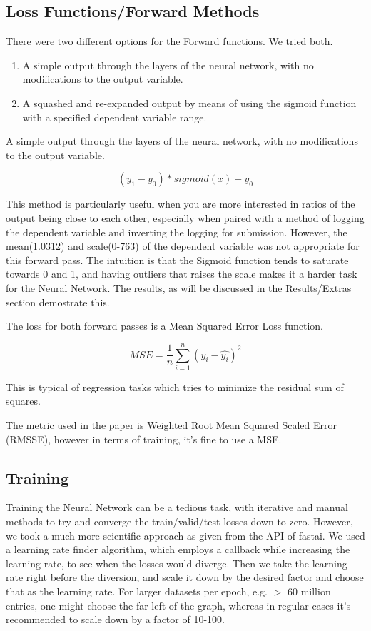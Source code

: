 \documentclass[10pt,twocolumn,letterpaper]{article}
\begin{document}
\subsection{Loss Functions/Forward Methods}
There were two different options for the Forward functions. We tried both.
\begin{enumerate}
  \item A simple output through the layers of the neural network, with no
  modifications to the output variable.
  \item A squashed and re-expanded output by means of using the sigmoid function
  with a specified dependent variable range.
\end{enumerate}
  A simple output through the layers of the neural network, with no
  modifications to the output variable.

\begin{equation}
  (y_1 - y_0) * sigmoid(x) + y_0
  \label{newEqn}
\end{equation}

  This method is particularly useful when you are more interested in ratios of
  the output being close to each other, especially when paired with a method of
  logging the dependent variable and inverting the logging for submission.
  However, the mean(1.0312) and scale(0-763) of the dependent variable was not
  appropriate for this forward pass. The intuition is that the Sigmoid function tends to
  saturate towards 0 and 1, and having outliers that raises the scale makes it a
  harder task for the Neural Network. The results, as will be discussed in the
  Results/Extras section demostrate this.

  The loss for both forward passes is a Mean Squared Error Loss function.

  \begin{equation}
    MSE = \frac{1}{n}\sum_{i=1}^{n} (y_i - \hat{y_i})^2
    \label{newEqn}
  \end{equation}

  This is typical of regression tasks which tries to minimize the residual sum
  of squares.

  The metric used in the paper is Weighted Root Mean Squared Scaled Error
  (RMSSE), however in terms of training, it’s fine to use a MSE.

\subsection{Training}
  Training the Neural Network can be a tedious task, with iterative and manual
  methods to try and converge the train/valid/test losses down to zero. However,
  we took a much more scientific approach as given from the API of fastai. We
  used a learning rate finder algorithm, which employs a callback while
  increasing the learning rate, to see when the losses would diverge. Then we
  take the learning rate right before the diversion, and scale it down by the desired factor and choose that as the learning rate. For larger datasets per
  epoch, e.g. $>$ 60 million entries, one might choose the far left of the graph,
  whereas in regular cases it’s recommended to scale down by a factor of 10-100.
\end{document}

